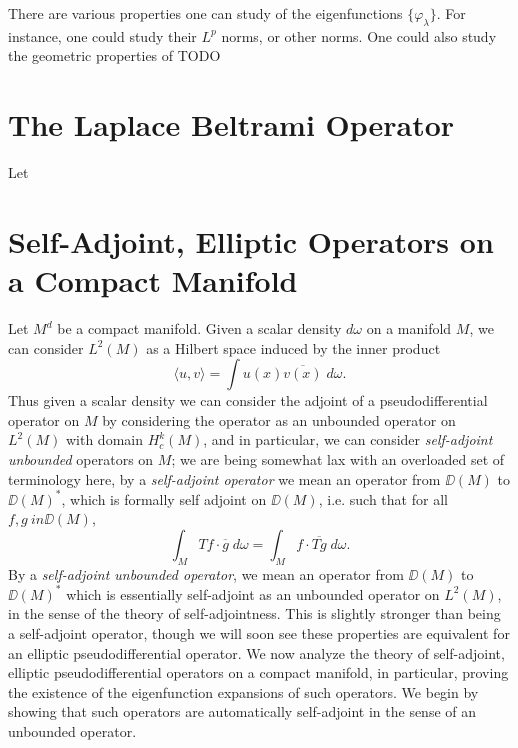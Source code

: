 There are various properties one can study of the eigenfunctions $\{ \varphi_\lambda \}$. For instance, one could study their $L^p$ norms, or other norms. One could also study the geometric properties of TODO







\chapter{The Laplace Beltrami Operator}

Let








\chapter{Self-Adjoint, Elliptic Operators on a Compact Manifold}

Let $M^d$ be a compact manifold. Given a scalar density $d\omega$ on a manifold $M$, we can consider $L^2(M)$ as a Hilbert space induced by the inner product
%
\[ \langle u, v \rangle = \int u(x) \overline{v(x)}\; d\omega. \]
%
Thus given a scalar density we can consider the adjoint of a pseudodifferential operator on $M$ by considering the operator as an unbounded operator on $L^2(M)$ with domain $H^k_c(M)$, and in particular, we can consider \emph{self-adjoint unbounded} operators on $M$; we are being somewhat lax with an overloaded set of terminology here, by a \emph{self-adjoint operator} we mean an operator from $\DD(M)$ to $\DD(M)^*$, which is formally self adjoint on $\DD(M)$, i.e. such that for all $f,g\ in \DD(M)$,
%
\[ \int_M Tf \cdot \overline{g}\; d\omega = \int_M f \cdot \overline{Tg}\; d\omega. \]
%
By a \emph{self-adjoint unbounded operator}, we mean an operator from $\DD(M)$ to $\DD(M)^*$ which is essentially self-adjoint as an unbounded operator on $L^2(M)$, in the sense of the theory of self-adjointness. This is slightly stronger than being a self-adjoint operator, though we will soon see these properties are equivalent for an elliptic pseudodifferential operator. We now analyze the theory of self-adjoint, elliptic pseudodifferential operators on a compact manifold, in particular, proving the existence of the eigenfunction expansions of such operators. We begin by showing that such operators are automatically self-adjoint in the sense of an unbounded operator.

